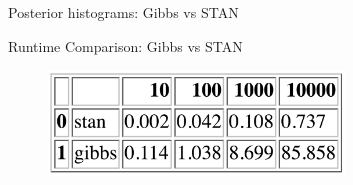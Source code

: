 \begin{frame}{Posterior histograms: Gibbs vs STAN}
\vspace*{-1cm}
\begin{figure}
	\centering
\end{figure}
\end{frame}

\begin{frame}{Runtime Comparison: Gibbs vs STAN}
\vspace*{-1cm}
\begin{figure}
	\centering
	\includegraphics[width=0.7\textwidth]{images/stanvsgibbs}
\end{figure}
\end{frame}


